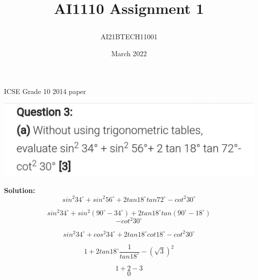 \documentclass[journal,12pt,twocolumn]{IEEEtran}
\title{\textbf{AI1110 Assignment 1}
\author{AI21BTECH11001 }}
\date{March 2022}
\newcommand{\C}{\circ}
\begin{document}
\maketitle
\begin{center}
{ICSE Grade 10 2014 paper}\end{center}

\includegraphics[scale=0.22]{main.jpeg}

\textbf{Solution:}
$$
    sin^2 34^\C + sin^2 56^\C +
 2tan 18^\C tan 72^\C - cot^2 30^\C 
$$


$$sin^2 34^\C + sin^2(90^\C - 34^\C)+2tan18^\C tan(90^\C- 18^\C) $$
$$- cot^2 30^\C$$

$$sin^2 34^\C + cos^2 34^\C +2tan18^\C cot18^\C - cot^2 30^\C $$

$$ 1 + 2tan18 ^\C \frac{1}{tan18^\C} - (\sqrt{3})^2$$

$$1 + 2 - 3$$
$$ 0$$
\end{document}
